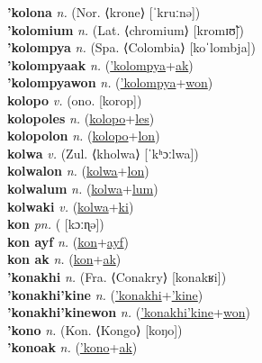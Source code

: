 \textbf{'kolona} \textit{n.} (Nor. ⟨krone⟩ [ˈkruːnə])
 \label{'kolona} \\
\textbf{'kolomium} \textit{n.} (Lat. ⟨chromium⟩ [kromɪʊ̃])
 \label{'kolomium} \\
\textbf{'kolompya} \textit{n.} (Spa. ⟨Colombia⟩ [koˈlombja])
 \label{'kolompya} \\
\textbf{'kolompyaak} \textit{n.} (\hyperref['kolompya]{'kolompya}+\hyperref[ak]{ak})
 \label{'kolompyaak} \\
\textbf{'kolompyawon} \textit{n.} (\hyperref['kolompya]{'kolompya}+\hyperref[won]{won})
 \label{'kolompyawon} \\
\textbf{kolopo} \textit{v.} (ono. [korop])
 \label{kolopo} \\
\textbf{kolopoles} \textit{n.} (\hyperref[kolopo]{kolopo}+\hyperref[les]{les})
 \label{kolopoles} \\
\textbf{kolopolon} \textit{n.} (\hyperref[kolopo]{kolopo}+\hyperref[lon]{lon})
 \label{kolopolon} \\
\textbf{kolwa} \textit{v.} (Zul. ⟨kholwa⟩ [ˈkʰɔːlwa])
 \label{kolwa} \\
\textbf{kolwalon} \textit{n.} (\hyperref[kolwa]{kolwa}+\hyperref[lon]{lon})
 \label{kolwalon} \\
\textbf{kolwalum} \textit{n.} (\hyperref[kolwa]{kolwa}+\hyperref[lum]{lum})
 \label{kolwalum} \\
\textbf{kolwaki} \textit{v.} (\hyperref[kolwa]{kolwa}+\hyperref[ki]{ki})
 \label{kolwaki} \\
\textbf{kon} \textit{pn.} ( [kɔːɳə])
 \label{kon} \\
\textbf{kon ayf} \textit{n.} (\hyperref[kon]{kon}+\hyperref[ayf]{ayf})
 \label{kon ayf} \\
\textbf{kon ak} \textit{n.} (\hyperref[kon]{kon}+\hyperref[ak]{ak})
 \label{kon ak} \\
\textbf{'konakhi} \textit{n.} (Fra. ⟨Conakry⟩ [konakʁi])
 \label{'konakhi} \\
\textbf{'konakhi'kine} \textit{n.} (\hyperref['konakhi]{'konakhi}+\hyperref['kine]{'kine})
 \label{'konakhi'kine} \\
\textbf{'konakhi'kinewon} \textit{n.} (\hyperref['konakhi'kine]{'konakhi'kine}+\hyperref[won]{won})
 \label{'konakhi'kinewon} \\
\textbf{'kono} \textit{n.} (Kon. ⟨Kongo⟩ [koŋo])
 \label{'kono} \\
\textbf{'konoak} \textit{n.} (\hyperref['kono]{'kono}+\hyperref[ak]{ak})
 \label{'konoak} \\
